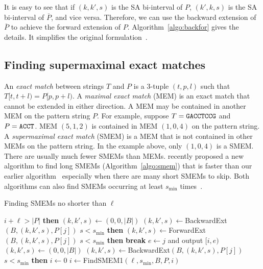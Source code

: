 \documentclass[webpdf,contemporary,large,namedate]{oup-authoring-template}%
\begin{document}
It is easy to see that if $(k,k',s)$ is the SA bi-interval of $P$, $(k',k,s)$ is the SA bi-interval of $\overline{P}$, and vice versa.
Therefore, we can use the backward extension of $\overline{P}$ to achieve the forward extension of $P$.
Algorithm~\ref{algo:backfor} gives the details.
It simplifies the original formulation~\citep{Li:2012fk}.

\subsection{Finding supermaximal exact matches}

An \emph{exact match} between strings $T$ and $P$ is a 3-tuple $(t,p,l)$ such that $T[t,t+l)=P[p,p+l)$.
A \emph{maximal exact match} (MEM) is an exact match that cannot be extended in either direction.
A MEM may be contained in another MEM on the pattern string $P$.
For example, suppose $T={\tt GACCTCCG}$ and $P={\tt ACCT}$.
MEM $(5,1,2)$ is contained in MEM $(1,0,4)$ on the pattern string.
A \emph{supermaximal exact match} (SMEM) is a MEM that is not contained in other MEMs on the pattern string.
In the example above, only $(1,0,4)$ is a SMEM.
There are usually much fewer SMEMs than MEMs.
\citet{DBLP:conf/dlt/Gagie24} recently proposed a new algorithm to find long SMEMs (Algorithm~\ref{algo:smem})
that is faster than our earlier algorithm~\citep{Li:2012fk}
especially when there are many short SMEMs to skip.
Both algorithms can also find SMEMs occurring at least $s_{\min}$ times~\citep{DBLP:conf/cpm/TatarnikovFKG23}.

\begin{algorithm}[b]
	\caption{Finding SMEMs no shorter than $\ell$~\citep{DBLP:conf/dlt/Gagie24}}\label{algo:smem}
	\begin{algorithmic}[1]
			 $i+\ell>|P|$ {\bf then} 
			\State $(k,k',s)\gets(0,0,|B|)$
				\State $(k,k',s)\gets${\sc BackwardExt}$(B,(k,k',s),P[j])$
				 $s<s_{\min}$ {\bf then} 
			\EndFor
				\State $(k,k',s)\gets${\sc ForwardExt}$(B,(k,k',s),P[j])$
				 $s<s_{\min}$ {\bf then} {\bf break}
			\EndFor
			\State $e\gets j$ and output $[i,e)$
			\State $(k,k',s)\gets(0,0,|B|)$
				\State $(k,k',s)\gets${\sc BackwardExt}$(B,(k,k',s),P[j])$
				 $s<s_{\min}$ {\bf then} 
			\EndFor
		\EndProcedure
			\State $i\gets0$
			\Repeat
				\State $i\gets${\sc FindSMEM1}$(\ell,s_{\min},B,P,i)$
		\EndProcedure
	\end{algorithmic}
\end{algorithm}
\end{document}
